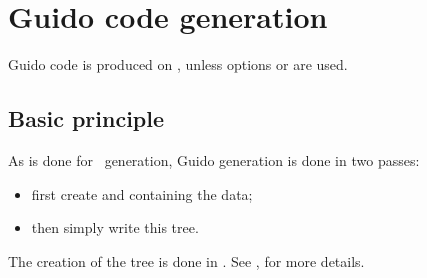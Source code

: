 
\chapter{Guido code generation}


Guido code is produced on \standardOutput, unless options  or  are used.


\section{Basic principle}

As is done for \mxml\ generation, Guido generation is done in two passes:
\begin{itemize}
\item first create and  containing the data;
\item then simply write this tree.
\end{itemize}

The creation of the tree is done in .
See , for more details.
